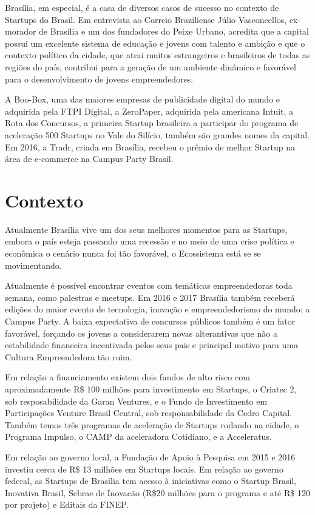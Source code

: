Brasília, em especial, é a casa de diversos casos de sucesso no contexto de Startups do Brasil. Em entrevista ao Correio Braziliense Júlio Vasconcellos, ex-morador de Brasília e um dos fundadores do Peixe Urbano, acredita que a capital possui um excelente sistema de educação e jovens com talento e ambição e que o contexto político da cidade, que atrai muitos estrangeiros e brasileiros de todas as regiões do país, contribui para a geração de um ambiente dinâmico e favorável para o desenvolvimento de jovens empreendedores. 

A Boo-Box, uma das maiores empresas de publicidade digital do mundo e adquirida pela FTPI Digital, a ZeroPaper, adquirida pela americana Intuit, a Rota dos Concursos, a primeira Startup brasileira a participar do programa de aceleração 500 Startups no Vale do Silício, também são grandes nomes da capital. Em 2016, a Tradr, criada em Brasília, recebeu o prêmio de melhor Startup na área de e-commerce na Campus Party Brasil.

\section{Contexto}
\label{section:contexto}

Atualmente Brasília vive um dos seus melhores momentos para as Startups, embora o país esteja passando uma recessão e no meio de uma crise política e econômica o cenário nunca foi tão favorável, o Ecossistema está se se movimentando. 

Atualmente é possível encontrar eventos com temáticas empreendedoras toda semana, como palestras e meetups. Em 2016 e 2017 Brasília também receberá edições do maior evento de tecnologia, inovação e empreendedorismo do mundo: a Campus Party. A baixa expectativa de concursos públicos também é um fator favorável, forçando os jovens a considerarem novas alterantivas que não a estabilidade financeira incentivada pelos seus pais e principal motivo para uma Cultura Empreendedora tão ruim.

Em relação a financiamento existem dois fundos de alto risco com aproximadamente R\$ 100 milhões para investimento em Startups, o Criatec 2, sob resposabilidade da Garan Ventures, e o Fundo de Investimento em Participações Venture Brasil Central, sob responsabilidade da Cedro Capital. Também temos três programas de aceleração de Startups rodando na cidade, o Programa Impulso, o CAMP da aceleradora Cotidiano, e a Acceleratus. 

Em relação ao governo local, a Fundação de Apoio à Pesquisa em 2015 e 2016 investiu cerca de R\$ 13 milhões em Startups locais. Em relação ao governo federal, as Startups de Brasília tem acesso à iniciativas como o Startup Brasil, Inovativa Brasil, Sebrae de Inovacão (R\$20 milhões para o programa e até R\$ 120 por projeto) e Editais da FINEP.

